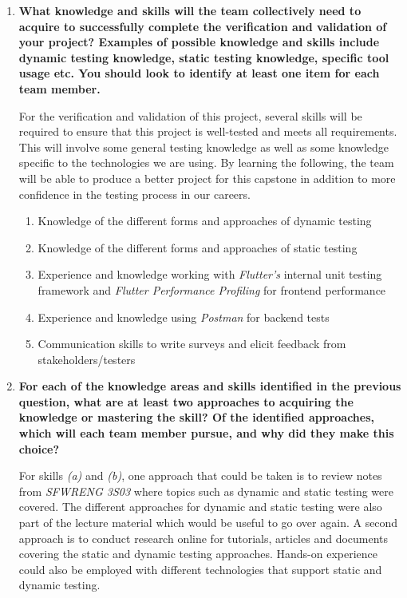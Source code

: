 \documentclass[12pt, titlepage]{article}
\begin{document}
\begin{enumerate}
  \item \textbf{What knowledge and skills will the team collectively need to acquire to
  successfully complete the verification and validation of your project?
  Examples of possible knowledge and skills include dynamic testing knowledge,
  static testing knowledge, specific tool usage etc.  You should look to
  identify at least one item for each team member.}

  For the verification and validation of this project, several skills will be required
  to ensure that this project is well-tested and meets all requirements. This will involve
  some general testing knowledge as well as some knowledge specific to the technologies we
  are using. By learning the following, the team will be able to produce a better project for this
  capstone in addition to more confidence in the testing process in our careers.
  \begin{enumerate}
    \item Knowledge of the different forms and approaches of dynamic testing
    \item Knowledge of the different forms and approaches of static testing
    \item Experience and knowledge working with \textit{Flutter's} internal unit testing framework and
    \textit{Flutter Performance Profiling} for frontend performance
    \item Experience and knowledge using \textit{Postman} for backend tests
    \item Communication skills to write surveys and elicit feedback from stakeholders/testers
  \end{enumerate}

  \item \textbf{For each of the knowledge areas and skills identified in the previous
  question, what are at least two approaches to acquiring the knowledge or
  mastering the skill?  Of the identified approaches, which will each team
  member pursue, and why did they make this choice?}

  For skills \textit{(a)} and \textit{(b)}, one approach that could be taken is to review notes from
  \textit{SFWRENG 3S03} where topics such as dynamic and static testing were covered. The different
  approaches for dynamic and static testing were also part of the lecture material which would be useful to go over again.
  A second approach is to conduct research online for tutorials, articles and documents covering the static and dynamic testing
  approaches. Hands-on experience could also be employed with different technologies that
  support static and dynamic testing.\par


\end{enumerate}
\end{document}
